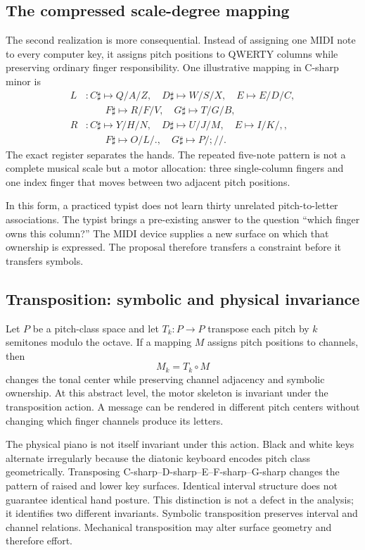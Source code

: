 \documentclass[11pt]{article}
\begin{document}
\subsection{The compressed scale-degree mapping}

The second realization is more consequential. Instead of assigning one MIDI note to every computer key, it assigns pitch positions to QWERTY columns while preserving ordinary finger responsibility. One illustrative mapping in C-sharp minor is
\begin{align*}
L &: C\sharp\mapsto Q/A/Z,\quad D\sharp\mapsto W/S/X,\quad E\mapsto E/D/C,\\
  &\qquad F\sharp\mapsto R/F/V,\quad G\sharp\mapsto T/G/B,\\[0.3em]
R &: C\sharp\mapsto Y/H/N,\quad D\sharp\mapsto U/J/M,\quad E\mapsto I/K/{,},\\
  &\qquad F\sharp\mapsto O/L/{.},\quad G\sharp\mapsto P/{;}/{/}.
\end{align*}
The exact register separates the hands. The repeated five-note pattern is not a complete musical scale but a motor allocation: three single-column fingers and one index finger that moves between two adjacent pitch positions.

In this form, a practiced typist does not learn thirty unrelated pitch-to-letter associations. The typist brings a pre-existing answer to the question ``which finger owns this column?'' The MIDI device supplies a new surface on which that ownership is expressed. The proposal therefore transfers a constraint before it transfers symbols.

\subsection{Transposition: symbolic and physical invariance}

Let $P$ be a pitch-class space and let $T_k:P\to P$ transpose each pitch by $k$ semitones modulo the octave. If a mapping $M$ assigns pitch positions to channels, then
\[
M_k=T_k\circ M
\]
changes the tonal center while preserving channel adjacency and symbolic ownership. At this abstract level, the motor skeleton is invariant under the transposition action. A message can be rendered in different pitch centers without changing which finger channels produce its letters.

The physical piano is not itself invariant under this action. Black and white keys alternate irregularly because the diatonic keyboard encodes pitch class geometrically. Transposing C-sharp--D-sharp--E--F-sharp--G-sharp changes the pattern of raised and lower key surfaces. Identical interval structure does not guarantee identical hand posture. This distinction is not a defect in the analysis; it identifies two different invariants. Symbolic transposition preserves interval and channel relations. Mechanical transposition may alter surface geometry and therefore effort.
\end{document}
